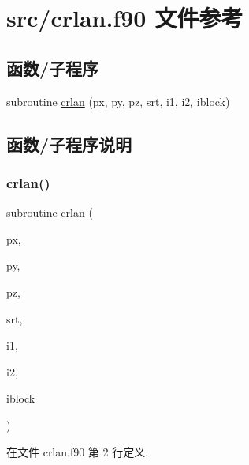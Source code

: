 \hypertarget{crlan_8f90}{}\section{src/crlan.f90 文件参考}
\label{crlan_8f90}
\subsection*{函数/子程序}
\begin{DoxyCompactItemize}
\item 
subroutine \mbox{\hyperlink{crlan_8f90_a422f078f2d0856902b4e2cd0eaf2d298}{crlan}} (px, py, pz, srt, i1, i2, iblock)
\end{DoxyCompactItemize}


\subsection{函数/子程序说明}
\mbox{\label{crlan_8f90_a422f078f2d0856902b4e2cd0eaf2d298}} 
\subsubsection{\texorpdfstring{crlan()}{crlan()}}
{\footnotesize\ttfamily subroutine crlan (\begin{DoxyParamCaption}\item[{}]{px,  }\item[{}]{py,  }\item[{}]{pz,  }\item[{}]{srt,  }\item[{}]{i1,  }\item[{}]{i2,  }\item[{}]{iblock }\end{DoxyParamCaption})}



在文件 crlan.\+f90 第 2 行定义.

